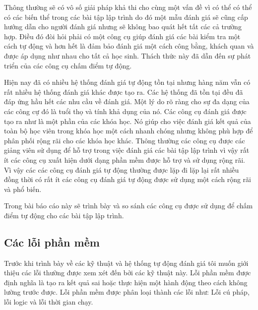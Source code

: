\documentclass[12pt,a4paper]{article}
\begin{document}
\indent Thông thường sẽ có vô số giải pháp khả thi cho cùng một vấn đề vì có thể có thể có các biến thể trong các bài tập lập trình do đó một mẫu đánh giá sẽ cũng cấp hướng dẫn cho người đánh giá nhưng sẽ không bao quát hết tất các cả trường hợp. Điều đó đòi hỏi phải có một công cụ giúp đánh giá các bài kiểm tra một cách tự động và hơn hết là đảm bảo đánh giá một cách công bằng, khách quan và được áp dụng như nhau cho tất cả học sinh. Thách thức này đã dẫn đến sự phát triển của các công cụ chấm điểm tự động.

\indent Hiện nay đã có nhiều hệ thống đánh giá tự động tồn tại nhưng hàng năm vẫn có rất nhiều hệ thống đánh giá khác được tạo ra. Các hệ thống đã tồn tại đều đã đáp ứng hầu hết các nhu cầu về đánh giá.
Một lý do rõ ràng cho sự đa dạng của các công cự đó là tuổi thọ và tính khả dụng của nó. Các công cụ đánh giá được tạo ra như là một phần của các khóa học. Nó giúp cho việc đánh giá kết quả của toàn bộ học viên trong khóa học một cách nhanh chóng nhưng không phù hợp để phân phối rộng rãi cho các khóa học khác. Thông thường các công cụ được các giảng viên sử dụng để hỗ trợ trong việc đánh giá các bài tập lập trình vì vậy rất ít các công cụ xuất hiện dưới dạng phần mềm được hỗ trợ và sử dụng rộng rãi. Vì vậy các các công cụ đánh giá tự động thường được lặp đi lặp lại rất nhiều đồng thời có rất ít các công cụ đánh giá tự động được sử dụng một cách rộng rãi và phổ biến.

\indent  Trong bài báo cáo này sẽ trình bày và so sánh các công cụ được sử dụng để chấm điểm tự động cho các bài tập lập trình.

\subsection{Các lỗi phần mềm}
Trước khi trình bày về các kỹ thuật và hệ thống tự động đánh giá tôi muốn giới thiệu các lỗi thường được xem xét đến bởi các kỹ thuật này. Lỗi phần mềm được định nghĩa là tạo ra kết quả sai hoặc thực hiện một hành động theo cách không lường trước được. Lỗi phần mềm được phân loại thành các lỗi như: Lỗi cú pháp, lỗi logic và lỗi thời gian chạy.
\end{document}
